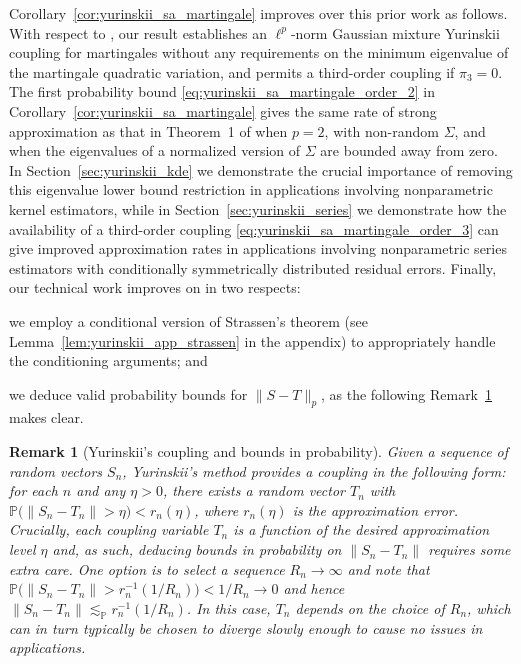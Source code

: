 \documentclass[11pt,lof]{puthesis}
\renewcommand{\P}{\ensuremath{\mathbb{P}}}
\theoremstyle{break}
\newtheorem{remark}{Remark}[section]
\theoremstyle{proof}
\begin{document}
Corollary~\ref{cor:yurinskii_sa_martingale} improves over this prior work as
follows.
With respect to \citet{li2020uniform}, our result establishes an $\ell^p$-norm
Gaussian mixture Yurinskii coupling for martingales without any requirements on
the minimum eigenvalue of the martingale quadratic variation, and permits a
third-order coupling if $\pi_3=0$. The first probability bound
\eqref{eq:yurinskii_sa_martingale_order_2} in
Corollary~\ref{cor:yurinskii_sa_martingale} gives the
same rate of strong approximation as that in Theorem~1 of \citet{li2020uniform}
when $p=2$, with non-random $\Sigma$, and when the eigenvalues of a normalized
version of $\Sigma$ are bounded away from zero. In
Section~\ref{sec:yurinskii_kde} we
demonstrate the crucial importance of removing this eigenvalue lower bound
restriction in applications involving nonparametric kernel estimators, while in
Section~\ref{sec:yurinskii_series} we demonstrate how the availability of a
third-order
coupling \eqref{eq:yurinskii_sa_martingale_order_3} can give improved
approximation rates
in applications involving nonparametric series estimators with conditionally
symmetrically distributed residual errors. Finally, our technical work improves
on \citet{li2020uniform} in two respects:
%
\begin{inlineroman}
\item
we employ a conditional version
of Strassen's theorem (see Lemma~\ref{lem:yurinskii_app_strassen}
in the appendix)
to appropriately handle the conditioning arguments; and
\item
we deduce valid
probability bounds for $\|S-T\|_p$, as the following
Remark~\ref{rem:yurinskii_coupling_bounds_probability} makes clear.
\end{inlineroman}

\begin{remark}[Yurinskii's coupling and bounds in probability]
\label{rem:yurinskii_coupling_bounds_probability}
Given a sequence of random vectors $S_n$, Yurinskii's method provides a
coupling in the following form: for each $n$ and any $\eta > 0$, there exists
a random vector $T_n$ with $\P\big(\|S_n - T_n\| > \eta\big) < r_n(\eta)$,
where $r_n(\eta)$ is the approximation error. Crucially, each coupling
variable $T_n$ is a function of the desired approximation level $\eta$ and,
as such, deducing bounds in probability on $\|S_n - T_n\|$ requires some
extra care. One option is to select a sequence $R_n \to \infty$ and note that
$\P\big(\|S_n - T_n\| > r_n^{-1}(1 / R_n)\big) < 1 / R_n \to 0$ and hence
$\|S_n - T_n\| \lesssim_\P r_n^{-1}(1 / R_n)$. In this case, $T_n$ depends on
the choice of $R_n$, which can in turn typically be chosen to diverge slowly
enough to cause no issues in applications.
\end{remark}
\end{document}
